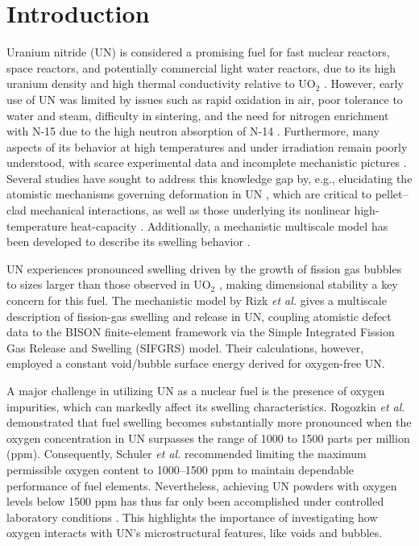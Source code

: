 \documentclass[preprint,12pt,sort&compress]{elsarticle}
\newcommand{\?}{\stackrel{?}{=}}
\begin{document}
\newpage

\linenumbers

\section{Introduction}
\label{intro}

Uranium nitride (UN) is considered a promising fuel for fast nuclear reactors, space reactors, and potentially commercial light water reactors, due to its high uranium density and high thermal conductivity relative to UO$_2$ \cite{Wallenius2020, Uno2020}. However, early use of UN was limited by issues such as rapid oxidation in air, poor tolerance to water and steam, difficulty in sintering, and the need for nitrogen enrichment with N-15 due to the high neutron absorption of N-14 \cite{Wallenius2020, Uno2020}. Furthermore, many aspects of its behavior at high temperatures and under irradiation remain poorly understood, with scarce experimental data and incomplete mechanistic pictures \cite{Wallenius2020, Uno2020}. Several studies have sought to address this knowledge gap by, e.g., elucidating the atomistic mechanisms governing deformation in UN \cite{AbdulHameed2024b, AbdulHameed2025}, which are critical to pellet--clad mechanical interactions, as well as those underlying its nonlinear high-temperature heat-capacity \cite{AbdulHameed2026}. Additionally, a mechanistic multiscale model has been developed to describe its swelling behavior \cite{Rizk2025}.

UN experiences pronounced swelling driven by the growth of fission gas bubbles to sizes larger than those observed in UO$_2$ \cite{Ronchi1975, Ronchi1978, Rizk2025}, making dimensional stability a key concern for this fuel. The mechanistic model by Rizk \textit{et al.} \cite{Rizk2025} gives a multiscale description of fission-gas swelling and release in UN, coupling atomistic defect data to the BISON finite-element framework via the Simple Integrated Fission Gas Release and Swelling (SIFGRS) model. Their calculations, however, employed a constant void/bubble surface energy derived for oxygen-free UN.

A major challenge in utilizing UN as a nuclear fuel is the presence of oxygen impurities, which can markedly affect its swelling characteristics. Rogozkin \textit{et al.} \cite{Rogozkin2003} demonstrated that fuel swelling becomes substantially more pronounced when the oxygen concentration in UN surpasses the range of 1000 to 1500 parts per million (ppm). Consequently, Schuler \textit{et al.} \cite{Schuler2017} recommended limiting the maximum permissible oxygen content to 1000--1500 ppm to maintain dependable performance of fuel elements. Nevertheless, achieving UN powders with oxygen levels below 1500 ppm has thus far only been accomplished under controlled laboratory conditions \cite{Schuler2017}. This highlights the importance of investigating how oxygen interacts with UN's microstructural features, like voids and bubbles. 
\end{document}
